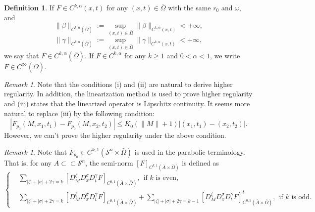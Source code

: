 \documentclass[preprint,12pt]{elsarticle}
\theoremstyle{definition}
\newtheorem{definition}[theorem]{Definition}
\theoremstyle{remark}
\newtheorem{remark}[theorem]{Remark}
\numberwithin{equation}{section}
\begin{document}
\begin{definition}
If $F\in C^{k, \alpha}(x,t)$ for any $(x,t)\in \bar{\Omega}$ with the same $r_0$ and $\omega$, and
\begin{equation*}
\|\beta\|_{C^{k,\alpha}(\bar{\Omega})}:=\sup_{(x,t)\in \bar\Omega} \|\beta\|_{C^{k,\alpha}(x,t)}<+\infty,
\end{equation*}
\begin{equation*}
\|\gamma\|_{C^{k,\alpha}(\bar{\Omega})}:=\sup_{(x,t)\in \bar\Omega} \|\gamma\|_{C^{k,\alpha}(x,t)}<+\infty,
\end{equation*}
we say that $F\in C^{k, \alpha}(\bar{\Omega})$. If $F \in C^{k,\alpha}$ for any $k\geq1$ and $0<\alpha< 1$, we write $F \in C^{\infty}(\bar{\Omega})$.
\end{definition}

\begin{remark}
Note that the conditions (i) and (ii) are natural to derive higher regularity. In addition, the linearization method is used to prove higher regularity and (iii) states that the linearized operator is Lipschitz continuity. It seems more natural to replace (iii) by the following condition:
\begin{equation*}
|F_{p_0}(M,x_1,t_1)-F_{p_0}(M,x_2,t_2)|\leq K_0 (\|M\|+1)|(x_1,t_1)-(x_2,t_2)|.
\end{equation*}
However, we can't prove the higher regularity under the above condition.
\end{remark}

\begin{remark}\label{re1.4}
Note that $F_{p_0} \in C^{k,1}(\mathcal{S}^n\times \bar{\Omega})$ is used in the parabolic terminology. That is, for any $A\subset\subset \mathcal{S}^n$, the semi-norm $[F]_{C^{k,1}(\bar A\times\bar{\Omega})}$ is defined as
\begin{equation*}
\left\{
  \begin{aligned}
&\sum_{|\zeta|+|\sigma|+2\gamma= k}
[D_M^{\zeta}D_{x}^{\sigma}D_{t}^{\gamma}F]_{C^{0,1}(\bar A\times\bar{\Omega})},~~
\mbox{if $k$ is even},~~\\
&\sum_{|\zeta|+|\sigma|+2\gamma= k}
[D_M^{\zeta}D_{x}^{\sigma}D_{t}^{\gamma}F]_{C^{0,1}(\bar A\times\bar{\Omega})}
+\sum_{|\zeta|+|\sigma|+2\gamma= k-1}
[D_M^{\zeta}D_{x}^{\sigma}D_{t}^{\gamma}F]^{t}_{C^{0,1}(\bar A\times\bar{\Omega})},~~
\mbox{if $k$ is odd}.
  \end{aligned}
  \right.
\end{equation*}
\end{remark}
~\\
\end{document}
